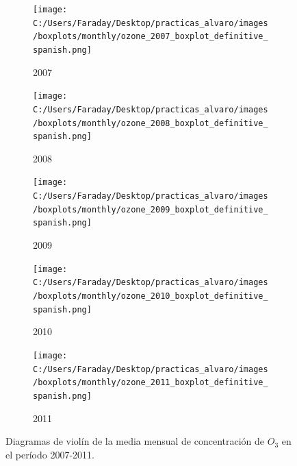 \documentclass[12pt]{article}
\begin{document}
\begin{figure}[H]
\centering
\begin{subfigure}[H]{0.45\textwidth}
\texttt{[image: C:/Users/Faraday/Desktop/practicas\_alvaro/images/boxplots/monthly/ozone\_2007\_boxplot\_definitive\_spanish.png]}
\captionsetup{labelformat=empty}
\caption{2007}
\label{fig:box-ozone-2007}
\end{subfigure}
%
\begin{subfigure}[H]{0.45\textwidth}
\texttt{[image: C:/Users/Faraday/Desktop/practicas\_alvaro/images/boxplots/monthly/ozone\_2008\_boxplot\_definitive\_spanish.png]}
\captionsetup{labelformat=empty}
\caption{2008}
\label{fig:box-ozone-2008}
\end{subfigure}

\begin{subfigure}[H]{0.45\textwidth}
\texttt{[image: C:/Users/Faraday/Desktop/practicas\_alvaro/images/boxplots/monthly/ozone\_2009\_boxplot\_definitive\_spanish.png]}
\captionsetup{labelformat=empty}
\caption{2009}
\label{fig:box-ozone-2009}
\end{subfigure}
%
\begin{subfigure}[H]{0.45\textwidth}
\texttt{[image: C:/Users/Faraday/Desktop/practicas\_alvaro/images/boxplots/monthly/ozone\_2010\_boxplot\_definitive\_spanish.png]}
\captionsetup{labelformat=empty}
\caption{2010}
\label{fig:box-ozone-2010}
\end{subfigure}

\begin{subfigure}[H]{0.45\textwidth}
\texttt{[image: C:/Users/Faraday/Desktop/practicas\_alvaro/images/boxplots/monthly/ozone\_2011\_boxplot\_definitive\_spanish.png]}
\captionsetup{labelformat=empty}
\caption{2011}
\label{fig:box-ozone-2011}
\end{subfigure}
\caption{Diagramas de violín de la media mensual de concentración de $O_{3}$ en el período 2007-2011.}
\label{fig:box-ozone-monthly}
\end{figure}
\end{document}
